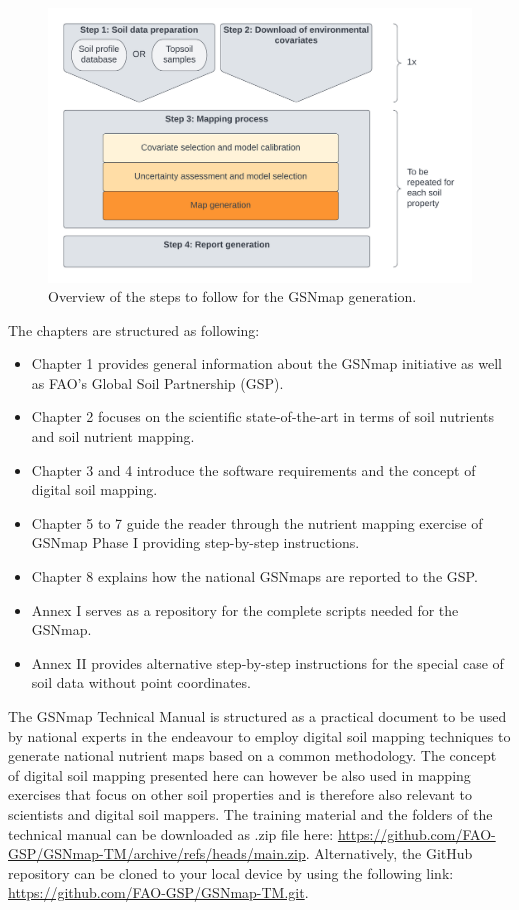 \documentclass[
  10pt,
  b5paper,
  oneside]{book}
\providecommand{\tightlist}{%
  \setlength{\itemsep}{0pt}\setlength{\parskip}{0pt}}
\begin{document}
\begin{figure}
\includegraphics[width=28.12in]{images/Manual-Workflow} \caption{Overview of the steps to follow for the GSNmap generation.}\label{fig:steps}
\end{figure}

The chapters are structured as following:

\begin{itemize}
\tightlist
\item
  Chapter 1 provides general information about the GSNmap initiative as well as FAO's Global Soil Partnership (GSP).
\item
  Chapter 2 focuses on the scientific state-of-the-art in terms of soil nutrients and soil nutrient mapping.
\item
  Chapter 3 and 4 introduce the software requirements and the concept of digital soil mapping.
\item
  Chapter 5 to 7 guide the reader through the nutrient mapping exercise of GSNmap Phase I providing step-by-step instructions.
\item
  Chapter 8 explains how the national GSNmaps are reported to the GSP.
\item
  Annex I serves as a repository for the complete scripts needed for the GSNmap.
\item
  Annex II provides alternative step-by-step instructions for the special case of soil data without point coordinates.
\end{itemize}

The GSNmap Technical Manual is structured as a practical document to be used by national experts in the endeavour to employ digital soil mapping techniques to generate national nutrient maps based on a common methodology. The concept of digital soil mapping presented here can however be also used in mapping exercises that focus on other soil properties and is therefore also relevant to scientists and digital soil mappers. The training material and the folders of the technical manual can be downloaded as .zip file here: \url{https://github.com/FAO-GSP/GSNmap-TM/archive/refs/heads/main.zip}. Alternatively, the GitHub repository can be cloned to your local device by using the following link: \url{https://github.com/FAO-GSP/GSNmap-TM.git}.
\end{document}
